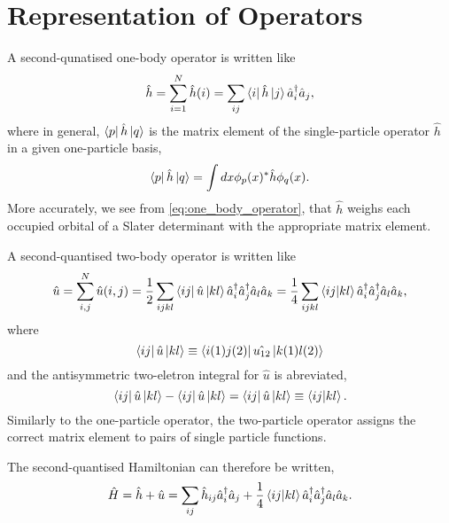\section{Representation of Operators}
    
    A second-qunatised one-body operator is written like
    \begin{equation}
        \label{eq:one_body_operator}
        \hat{h} = \sum_{i=1}^N \hat{h}(i) 
        = \sum_{ij} \bra{i} \hat{h} \ket{j}\hat{a}_i^\dagger \hat{a}_j,
    \end{equation}
    where in general, $\bra{p} \hat{h} \ket{q}$ is the matrix element of the single-particle
    operator $\hat{h}$ in a given one-particle basis,
    \begin{equation}
        \bra{p} \hat{h} \ket{q} = \int dx \phi_p(x)^* \hat{h} \phi_q(x).
    \end{equation}
    More accurately, we see from \autoref{eq:one_body_operator}, that $\hat{h}$
    weighs each occupied orbital of a Slater determinant with the appropriate 
    matrix element. 

    A second-quantised two-body operator is written like
    \begin{equation}
        \hat{u} = \sum_{i, j}^N\hat{u}(i,j) 
        = \frac{1}{2} \sum_{ijkl} \bra{ij}\hat{u}\ket{kl} 
            \hat{a}_i^\dagger \hat{a}_j^\dagger \hat{a}_l \hat{a}_k
        = \frac{1}{4} \sum_{ijkl} \bra{ij}  \ket{kl} 
            \hat{a}_i^\dagger \hat{a}_j^\dagger \hat{a}_l \hat{a}_k,
    \end{equation}
    where 
    \begin{equation}
        \bra{ij}\hat{u} \ket{kl} \equiv \bra{i(1)j(2)} \hat{u_{12}} \ket{k(1)l(2)}
    \end{equation} 
    and the antisymmetric two-eletron integral for $\hat{u}$ is abreviated,
    \begin{equation}
        \bra{ij} \hat{u}\ket{kl} - \bra{ij}\hat{u} \ket{kl} 
        = \bra{ij}\hat{u} \ket{kl} \equiv \bra{ij} \ket{kl}.
    \end{equation}
    Similarly to the one-particle operator, the two-particle operator assigns
    the correct matrix element to pairs of single particle functions.

    The second-quantised Hamiltonian can therefore be written,
    \begin{equation}
        \label{eq:second_quant_hamiltionian}
        \hat{H} = \hat{h} + \hat{u} 
        = \sum_{ij} \hat{h}_{ij}\hat{a}^\dagger_i \hat{a}_j
            + \frac{1}{4} \bra{ij}\ket{kl} 
            \hat{a}^\dagger_i \hat{a}^\dagger_j \hat{a}_l \hat{a}_k.
    \end{equation}

